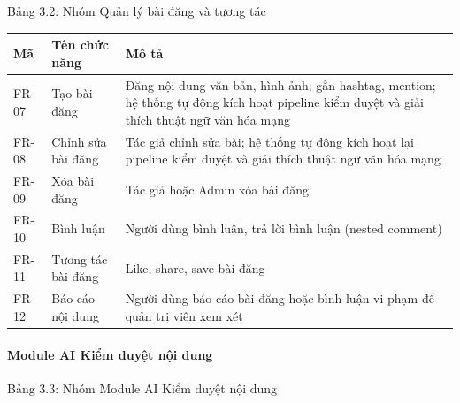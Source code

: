 Bảng 3.2: Nhóm Quản lý bài đăng và tương tác

{\def\LTcaptype{none} %
\begin{longtable}{
  |>{\centering\arraybackslash}p{}
  |>{\centering\arraybackslash}p{}
  |>{\centering\arraybackslash}p{}|}
\endhead
\hline
\endlastfoot
Mã & Tên chức năng & Mô tả \\ \hline
FR-07 & Tạo bài đăng & Đăng nội dung văn bản, hình ảnh; gắn hashtag,
mention; hệ thống tự động kích hoạt pipeline kiểm duyệt và giải thích
thuật ngữ văn hóa mạng \\ \hline
FR-08 & Chỉnh sửa bài đăng & Tác giả chỉnh sửa bài; hệ thống tự động
kích hoạt lại pipeline kiểm duyệt và giải thích thuật ngữ văn hóa mạng \\ \hline
FR-09 & Xóa bài đăng & Tác giả hoặc Admin xóa bài đăng \\ \hline
FR-10 & Bình luận & Người dùng bình luận, trả lời bình luận (nested
comment) \\ \hline
FR-11 & Tương tác bài đăng & Like, share, save bài đăng \\ \hline
FR-12 & Báo cáo nội dung & Người dùng báo cáo bài đăng hoặc bình luận vi
phạm để quản trị viên xem xét \\ \hline
\end{longtable}
}

\paragraph{\texorpdfstring{Module AI Kiểm duyệt nội dung
}{Module AI Kiểm duyệt nội dung }}\label{module-ai-kiux1ec3m-duyux1ec7t-nux1ed9i-dung}

Bảng 3.3: Nhóm Module AI Kiểm duyệt nội dung

